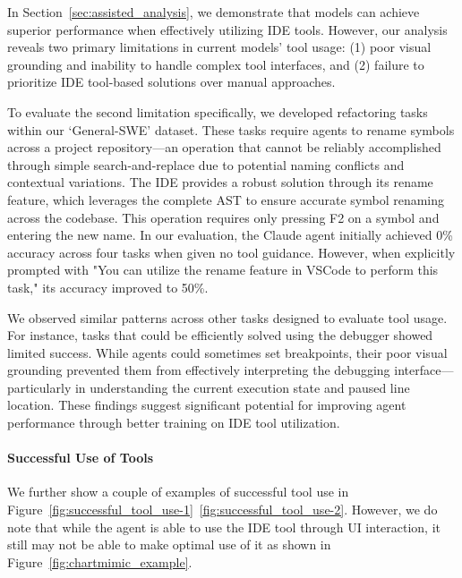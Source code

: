 In Section~\ref{sec:assisted_analysis}, we demonstrate that models can achieve superior performance when effectively utilizing IDE tools. However, our analysis reveals two primary limitations in current models' tool usage: (1) poor visual grounding and inability to handle complex tool interfaces, and (2) failure to prioritize IDE tool-based solutions over manual approaches.

To evaluate the second limitation specifically, we developed refactoring tasks within our `General-SWE' dataset. These tasks require agents to rename symbols across a project repository—an operation that cannot be reliably accomplished through simple search-and-replace due to potential naming conflicts and contextual variations. The IDE provides a robust solution through its rename feature, which leverages the complete AST to ensure accurate symbol renaming across the codebase. This operation requires only pressing F2 on a symbol and entering the new name. In our evaluation, the Claude agent initially achieved 0\% accuracy across four tasks when given no tool guidance. However, when explicitly prompted with "You can utilize the rename feature in VSCode to perform this task," its accuracy improved to 50\%.

We observed similar patterns across other tasks designed to evaluate tool usage. For instance, tasks that could be efficiently solved using the debugger showed limited success. While agents could sometimes set breakpoints, their poor visual grounding prevented them from effectively interpreting the debugging interface—particularly in understanding the current execution state and paused line location. These findings suggest significant potential for improving agent performance through better training on IDE tool utilization.

\paragraph{Successful Use of Tools}

We further show a couple of examples of successful tool use in Figure~\ref{fig:successful_tool_use-1}~\ref{fig:successful_tool_use-2}. However, we do note that while the agent is able to use the IDE tool through UI interaction, it still may not be able to make optimal use of it as shown in Figure~\ref{fig:chartmimic_example}.
